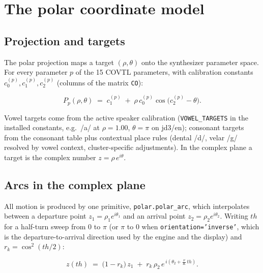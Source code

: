 \documentclass[11pt,a4paper]{article}
\newcommand{\code}[1]{\texttt{#1}}
\begin{document}
\section{The polar coordinate model}

\subsection{Projection and targets}

The polar projection maps a target $(\rho, \theta)$ onto the
synthesizer parameter space. For every parameter $p$ of the 15
COVTL parameters, with calibration constants $c_0^{(p)}, c_1^{(p)},
c_2^{(p)}$ (columns of the matrix \code{CO}):

\begin{equation}
P_p(\rho, \theta) \;=\; c_1^{(p)} \;+\; \rho \, c_0^{(p)}
        \cos\!\bigl(c_2^{(p)} - \theta\bigr).
\label{eq:projection}
\end{equation}

Vowel targets come from the active speaker calibration
(\code{VOWEL\_TARGETS} in the installed constants, e.g.\ /a/ at
$\rho = 1.00$, $\theta = \pi$ on jd3/en); consonant targets from the consonant table plus contextual
place rules (dental /d/, velar /g/ resolved by vowel context,
cluster-specific adjustments). In the complex plane a target is the
complex number $z = \rho\, e^{i\theta}$.

\subsection{Arcs in the complex plane}

All motion is produced by one primitive, \code{polar.polar\_arc},
which interpolates between a departure point $z_1 = \rho_1
e^{i\theta_1}$ and an arrival point $z_2 = \rho_2 e^{i\theta_2}$.
Writing $\mathit{th}$ for a half-turn sweep from $0$ to $\pi$ (or
$\pi$ to $0$ when \code{orientation='inverse'}, which is the
departure-to-arrival direction used by the engine and the display)
and $r_k = \cos^2(\mathit{th}/2)$:

\begin{equation}
z(\mathit{th}) \;=\; \bigl(1 - r_k\bigr)\, z_1 \;+\;
      r_k \, \rho_2 \, e^{\,i\left(\theta_2 + \frac{\nu}{K}\,
      \mathit{th}\right)} .
\label{eq:arc}
\end{equation}
\end{document}
